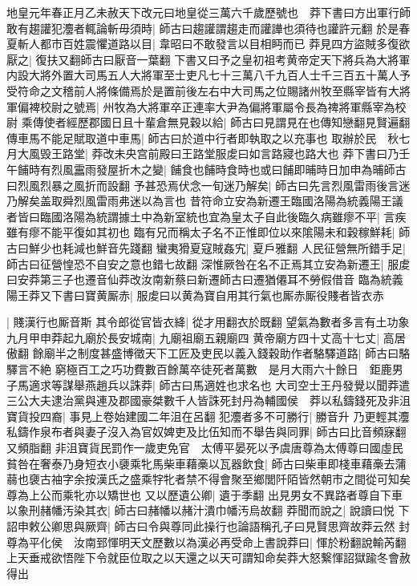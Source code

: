 地皇元年春正月乙未赦天下改元曰地皇從三萬六千歲歷號也　莽下書曰方出軍行師敢有趨讙犯灋者輒論斬毋須時|{
	師古曰趨讙謂趨走而讙譁也須待也讙許元翻}
於是春夏斬人都市百姓震懼道路以目|{
	韋昭曰不敢發言以目相眄而已}
莽見四方盜賊多復欲厭之|{
	復扶又翻師古曰厭音一葉翻}
下書又曰予之皇初祖考黄帝定天下將兵為大將軍内設大將外置大司馬五人大將軍至士吏凡七十三萬八千九百人士千三百五十萬人予受符命之文稽前人將條備焉於是置前後左右中大司馬之位賜諸州牧至縣宰皆有大將軍偏裨校尉之號焉|{
	州牧為大將軍卒正連率大尹為偏將軍屬令長為禆將軍縣宰為校尉}
乘傳使者經歷郡國日且十輩倉無見穀以給|{
	師古曰見謂見在也傳知戀翻見賢遍翻}
傳車馬不能足賦取道中車馬|{
	師古曰於道中行者即執取之以充事也}
取辦於民　秋七月大風毁王路堂|{
	莽改未央宫前殿曰王路堂服䖍曰如言路寢也路大也}
莽下書曰乃壬午餔時有烈風靁雨發屋折木之變|{
	餔食也餔時食時也或曰餔即晡時日加申為晡師古曰烈風烈暴之風折而設翻}
予甚恐焉伏念一旬迷乃解矣|{
	師古曰先言烈風雷雨後言迷乃解矣盖取舜烈風雷雨弗迷以為言也}
昔符命立安為新遷王臨國洛陽為統義陽王議者皆曰臨國洛陽為統謂據土中為新室統也宜為皇太子自此後臨久病雖瘳不平|{
	言疾雖有瘳不能平復如其初也}
臨有兄而稱太子名不正惟即位以來隂陽未和穀稼鮮耗|{
	師古曰鮮少也耗減也鮮音先踐翻}
蠻夷猾夏寇賊姦宄|{
	夏戶雅翻}
人民征營無所錯手足|{
	師古曰征營惶恐不自安之意也錯七故翻}
深惟厥咎在名不正焉其立安為新遷王|{
	服䖍曰安莽第三子也遷音仙莽改汝南新蔡曰新遷師古曰遷猶僊耳不勞假借音}
臨為統義陽王莽又下書曰寶黄厮赤|{
	服䖍曰以黄為寶自用其行氣也厮赤厮役賤者皆衣赤}


|{
	賤漢行也厮音斯}
其令郎從官皆衣絳|{
	從才用翻衣於既翻}
望氣為數者多言有土功象九月甲申莽起九廟於長安城南|{
	九廟祖廟五親廟四}
黄帝廟方四十丈高十七丈|{
	高居傲翻}
餘廟半之制度甚盛博徵天下工匠及吏民以義入錢穀助作者駱驛道路|{
	師古曰駱驛言不絶}
窮極百工之巧功費數百餘萬卒徒死者萬數　是月大雨六十餘日　鉅鹿男子馬適求等謀舉燕趙兵以誅莽|{
	師古曰馬適姓也求名也}
大司空士王丹發覺以聞莽遣三公大夫逮治黨與連及郡國豪桀數千人皆誅死封丹為輔國侯　莽以私鑄錢死及非沮寶貨投四裔|{
	事見上卷始建國二年沮在呂翻}
犯灋者多不可勝行|{
	勝音升}
乃更輕其灋私鑄作泉布者與妻子沒入為官奴婢吏及比伍知而不舉告與同罪|{
	師古曰比音頻寐翻又頻脂翻}
非沮寶貨民罰作一歲吏免官　太傅平晏死以予虞唐尊為太傅尊曰國虛民貧咎在奢泰乃身短衣小褏乘牝馬柴車藉槀以瓦器飲食|{
	師古曰柴車即棧車藉槀去蒲蒻也褏古袖字余按漢氏之盛乘牸牝者禁不得會聚至鄉閭阡陌皆然朝市之間從可知矣尊為上公而乘牝亦以矯世也}
又以歷遺公卿|{
	遺于季翻}
出見男女不異路者尊自下車以象刑赭幡汚染其衣|{
	師古曰赭幡以赭汁潰巾幡汚烏故翻}
莽聞而說之|{
	說讀曰悦}
下詔申敕公卿思與厥齊|{
	師古曰令與尊同此操行也論語稱孔子曰見賢思齊故莽云然}
封尊為平化侯　汝南郅惲明天文歷數以為漢必再受命上書說莽曰|{
	惲於粉翻說輸芮翻}
上天垂戒欲悟陛下令就臣位取之以天還之以天可謂知命矣莽大怒繋惲詔獄踰冬會赦得出

